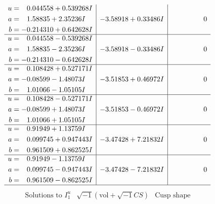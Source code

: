 \documentclass[1p]{elsarticle_modified}
\theoremstyle{definition}
\newcommand{\I}{\sqrt{-1}}
\begin{document}
$$\begin{array}{c|c|c}
\begin{aligned}
u &= \phantom{-}0.044558 + 0.539268 I \\
a &= \phantom{-}1.58835 + 2.35236 I \\
b &= -0.214310 + 0.642628 I\end{aligned}
 & -3.58918 + 0.33486 I & \phantom{-0.000000 } 0 \\ \hline\begin{aligned}
u &= \phantom{-}0.044558 - 0.539268 I \\
a &= \phantom{-}1.58835 - 2.35236 I \\
b &= -0.214310 - 0.642628 I\end{aligned}
 & -3.58918 - 0.33486 I & \phantom{-0.000000 } 0 \\ \hline\begin{aligned}
u &= \phantom{-}0.108428 + 0.527171 I \\
a &= -0.08599 - 1.48073 I \\
b &= \phantom{-}1.01066 - 1.05105 I\end{aligned}
 & -3.51853 + 0.46972 I & \phantom{-0.000000 } 0 \\ \hline\begin{aligned}
u &= \phantom{-}0.108428 - 0.527171 I \\
a &= -0.08599 + 1.48073 I \\
b &= \phantom{-}1.01066 + 1.05105 I\end{aligned}
 & -3.51853 - 0.46972 I & \phantom{-0.000000 } 0 \\ \hline\begin{aligned}
u &= \phantom{-}0.91949 + 1.13759 I \\
a &= \phantom{-}0.099745 + 0.947443 I \\
b &= \phantom{-}0.961509 + 0.862525 I\end{aligned}
 & -3.47428 + 7.21832 I & \phantom{-0.000000 } 0 \\ \hline\begin{aligned}
u &= \phantom{-}0.91949 - 1.13759 I \\
a &= \phantom{-}0.099745 - 0.947443 I \\
b &= \phantom{-}0.961509 - 0.862525 I\end{aligned}
 & -3.47428 - 7.21832 I & \phantom{-0.000000 } 0\\
 \hline 
 \end{array}$$\newpage$$\begin{array}{c|c|c}  
\text{Solutions to }I^u_{1}& \I (\text{vol} + \sqrt{-1}CS) & \text{Cusp shape}\\
 \hline 
\begin{aligned}

\end{aligned}
\end{array}$$
\end{document}

